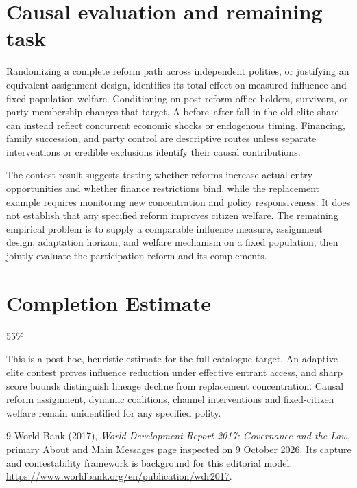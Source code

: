 \documentclass[11pt]{article}
\begin{document}
\section*{Causal evaluation and remaining task}
Randomizing a complete reform path across independent polities, or justifying an equivalent assignment design, identifies its total effect on measured influence and fixed-population welfare. Conditioning on post-reform office holders, survivors, or party membership changes that target. A before--after fall in the old-elite share can instead reflect concurrent economic shocks or endogenous timing. Financing, family succession, and party control are descriptive routes unless separate interventions or credible exclusions identify their causal contributions.

The contest result suggests testing whether reforms increase actual entry opportunities and whether finance restrictions bind, while the replacement example requires monitoring new concentration and policy responsiveness. It does not establish that any specified reform improves citizen welfare. The remaining empirical problem is to supply a comparable influence measure, assignment design, adaptation horizon, and welfare mechanism on a fixed population, then jointly evaluate the participation reform and its complements.

\section{Completion Estimate}
55\%

This is a post hoc, heuristic estimate for the full catalogue target.
An adaptive elite contest proves influence reduction under effective entrant access, and sharp score bounds distinguish lineage decline from replacement concentration. Causal reform assignment, dynamic coalitions, channel interventions and fixed-citizen welfare remain unidentified for any specified polity.

\begin{thebibliography}{9}
 World Bank (2017), \emph{World Development Report 2017: Governance and the Law}, primary About and Main Messages page inspected on 9 October 2026. Its capture and contestability framework is background for this editorial model. \url{https://www.worldbank.org/en/publication/wdr2017}.
\end{thebibliography}
\end{document}
